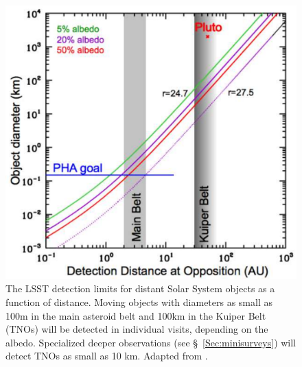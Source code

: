 \begin{figure}
\includegraphics[width=1.0\hsize,clip]{Af9.pdf}
\caption{The LSST detection limits for distant Solar System objects as
  a function of distance.
Moving objects with diameters as small as 100m in the main asteroid belt and
100km in the Kuiper Belt (TNOs) will be detected in individual visits,
depending on the albedo. Specialized deeper observations
(see \S~\ref{Sec:minisurveys}) will detect TNOs as small as 10 km. Adapted from
\cite{2007AAS...21113714J}.}
\label{Fig:Af9}
\end{figure}



